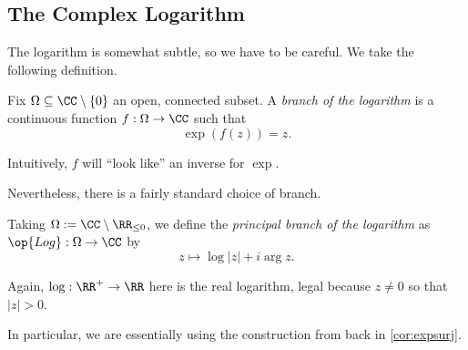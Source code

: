 \subsection{The Complex Logarithm}
The logarithm is somewhat subtle, so we have to be careful. We take the following definition.
\begin{definition}
	Fix $\Omega\subseteq\CC\setminus\{0\}$ an open, connected subset. A \textit{branch of the logarithm} is a continuous function $f:\Omega\to\CC$ such that
	\[\exp(f(z))=z.\] 
\end{definition}
Intuitively, $f$ will ``look like'' an inverse for $\exp$.

Nevertheless, there is a fairly standard choice of branch.
\begin{definition}
	Taking $\Omega:=\CC\setminus\RR_{\le0}$, we define the \textit{principal branch of the logarithm} as $\op{Log}:\Omega\to\CC$ by
	\[z\mapsto\log|z|+i\arg z.\]
\end{definition}
\begin{remark}
	Again, $\log:\RR^+\to\RR$ here is the real logarithm, legal because $z\ne0$ so that $|z|>0$.
\end{remark}
In particular, we are essentially using the construction from back in \autoref{cor:expsurj}.

